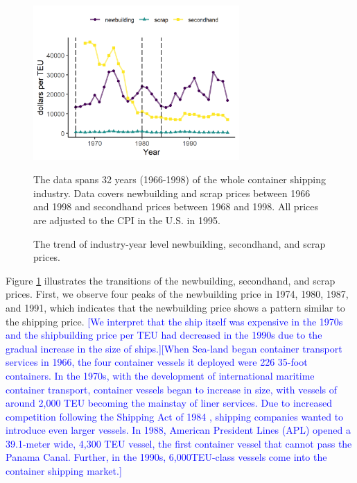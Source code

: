 \documentclass[11pt]{article}
\begin{document}
\begin{figure}[!ht]
\begin{center}
\includegraphics[width = 0.7\textwidth]{figuretable/price_newbuilding_secondhand_scrap.png}
\caption{The trend of industry-year level newbuilding, secondhand, and scrap prices.}
\label{fg:price_newbuilding_secondhand_scrap}
\end{center}
\footnotesize
The data spans 32 years (1966-1998) of the whole container shipping industry. Data covers newbuilding and scrap prices between 1966 and 1998 and secondhand prices between 1968 and 1998. All prices are adjusted to the CPI in the U.S. in 1995. 
\end{figure}

Figure \ref{fg:price_newbuilding_secondhand_scrap} illustrates the transitions of the newbuilding, secondhand, and scrap prices. First, we observe four peaks of the newbuilding price in 1974, 1980, 1987, and 1991, which indicates that the newbuilding price shows a pattern similar to the shipping price. \textcolor{blue}{[We interpret that the ship itself was expensive in the 1970s and the shipbuilding price per TEU had decreased in the 1990s due to the gradual increase in the size of ships.]}\textcolor{blue}{[When Sea-land began container transport services in 1966, the four container vessels it deployed were 226 35-foot containers. In the 1970s, with the development of international maritime container transport, container vessels began to increase in size, with vessels of around 2,000 TEU becoming the mainstay of liner services. Due to increased competition following the Shipping Act of 1984 \citep{matsuda2022disentangling}, shipping companies wanted to introduce even larger vessels. In 1988, American President Lines (APL) opened a 39.1-meter wide, 4,300 TEU vessel, the first container vessel that cannot pass the Panama Canal. Further, in the 1990s, 6,000TEU-class vessels come into the container shipping market.]}
\end{document}
